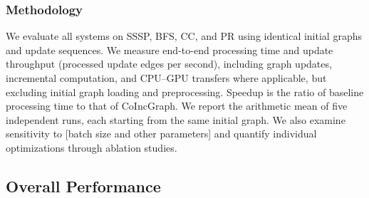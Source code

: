 \subsubsection{Methodology} We evaluate all systems on SSSP, BFS, CC, and PR using identical initial graphs and update sequences. We measure end-to-end processing time and update throughput (processed update edges per second), including graph updates, incremental computation, and CPU--GPU transfers where applicable, but excluding initial graph loading and preprocessing. Speedup is the ratio of baseline processing time to that of CoIncGraph. We report the arithmetic mean of five independent runs, each starting from the same initial graph. We also examine sensitivity to [batch size and other parameters] and quantify individual optimizations through ablation studies.




\subsection{Overall Performance}

